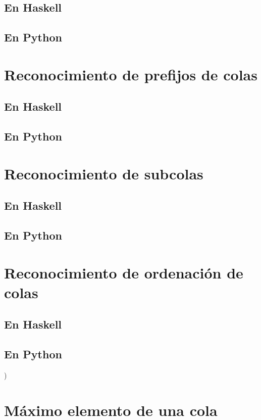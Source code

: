\documentclass[a4paper,12pt,twoside]{book}
\begin{document}
\subsection{En Haskell}
\subsection{En Python}

\section{Reconocimiento de prefijos de colas}
\subsection{En Haskell}
\subsection{En Python}

\section{Reconocimiento de subcolas}
\subsection{En Haskell}
\subsection{En Python}

\section{Reconocimiento de ordenación de colas}
\subsection{En Haskell}
\subsection{En Python}

)\section{Máximo elemento de una cola}
\end{document}
